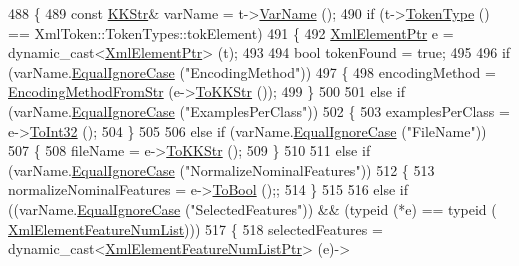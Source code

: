\begin{DoxyCode}
488 \{
489   \textcolor{keyword}{const} \hyperlink{class_k_k_b_1_1_k_k_str}{KKStr}&  varName = t->\hyperlink{class_k_k_b_1_1_xml_token_a28b39cfdfa2ed63048a812b1cb52263c}{VarName} ();
490   \textcolor{keywordflow}{if}  (t->\hyperlink{class_k_k_b_1_1_xml_token_ae98e2c1a798882647578cae4adcd7176}{TokenType} () == XmlToken::TokenTypes::tokElement)
491   \{
492     \hyperlink{class_k_k_b_1_1_xml_element}{XmlElementPtr}  e = \textcolor{keyword}{dynamic\_cast<}\hyperlink{class_k_k_b_1_1_xml_element}{XmlElementPtr}\textcolor{keyword}{>} (t);
493 
494     \textcolor{keywordtype}{bool}  tokenFound = \textcolor{keyword}{true};
495 
496     \textcolor{keywordflow}{if}  (varName.\hyperlink{class_k_k_b_1_1_k_k_str_a562f9696417c53f66bc4088eac072ab5}{EqualIgnoreCase} (\textcolor{stringliteral}{"EncodingMethod"}))
497     \{
498       encodingMethod = \hyperlink{class_k_k_m_l_l_1_1_model_param_a4aaa08b3e8e037ba1f8ac33b4389a53b}{EncodingMethodFromStr} (e->\hyperlink{class_k_k_b_1_1_xml_element_a3028fc03b79509e6378749f6a8b426b9}{ToKKStr} ());
499     \}
500 
501     \textcolor{keywordflow}{else} \textcolor{keywordflow}{if}  (varName.\hyperlink{class_k_k_b_1_1_k_k_str_a562f9696417c53f66bc4088eac072ab5}{EqualIgnoreCase} (\textcolor{stringliteral}{"ExamplesPerClass"}))
502     \{
503       examplesPerClass = e->\hyperlink{class_k_k_b_1_1_xml_element_aac7463c7b305f66b5157f424a0a76363}{ToInt32} ();
504     \}
505 
506     \textcolor{keywordflow}{else} \textcolor{keywordflow}{if}  (varName.\hyperlink{class_k_k_b_1_1_k_k_str_a562f9696417c53f66bc4088eac072ab5}{EqualIgnoreCase} (\textcolor{stringliteral}{"FileName"}))
507     \{
508       fileName = e->\hyperlink{class_k_k_b_1_1_xml_element_a3028fc03b79509e6378749f6a8b426b9}{ToKKStr} ();
509     \}
510 
511     \textcolor{keywordflow}{else} \textcolor{keywordflow}{if}  (varName.\hyperlink{class_k_k_b_1_1_k_k_str_a562f9696417c53f66bc4088eac072ab5}{EqualIgnoreCase} (\textcolor{stringliteral}{"NormalizeNominalFeatures"}))
512     \{
513       normalizeNominalFeatures = e->\hyperlink{class_k_k_b_1_1_xml_element_a7bfbbea204722bc4535a294bc43e8e17}{ToBool} ();;
514     \}
515 
516     \textcolor{keywordflow}{else} \textcolor{keywordflow}{if}  ((varName.\hyperlink{class_k_k_b_1_1_k_k_str_a562f9696417c53f66bc4088eac072ab5}{EqualIgnoreCase} (\textcolor{stringliteral}{"SelectedFeatures"}))  &&  (\textcolor{keyword}{typeid} (*e) == \textcolor{keyword}{typeid} (
      \hyperlink{namespace_k_k_m_l_l_aab39b3abe8386108dfce16438bfb5ecf}{XmlElementFeatureNumList})))
517     \{
518       selectedFeatures = \textcolor{keyword}{dynamic\_cast<}\hyperlink{class_k_k_b_1_1_xml_element_template}{XmlElementFeatureNumListPtr}\textcolor{keyword}{>} (e)->

\end{DoxyCode}
